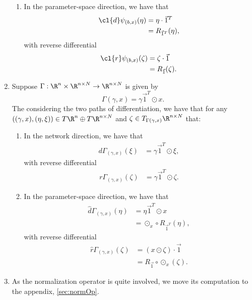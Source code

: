 \begin{enumerate}
\begin{enumerate}
		\item In the parameter-space direction, we have that
		\begin{align*}
			\cl{d}\psi_{(b,x)}(\eta)&=\eta\cdot\vec{1}^T\\
			&=R_{\vec{1}^T}(\eta),
		\end{align*}
		with reverse differential
		\begin{align*}
			\cl{r}\psi_{(b,x)}(\zeta)&=\zeta\cdot\vec{1}\\
			&=R_{\vec{1}}(\zeta).
		\end{align*}
	\end{enumerate}
	
	\item Suppose $\Gamma:\R^n\times\R^{n\times N}\to\R^{n\times N}$ is given by
	$$\Gamma(\gamma,x)=\gamma\vec{1}^T\odot x.$$
	The considering the two paths of differentiation, we have that for any $((\gamma,x), (\eta,\xi))\in T\R^n\oplus T\R^{n\times N}$ and $\zeta\in T_{\Gamma(\gamma,x)}\R^{n\times N}$ that:
	\begin{enumerate}
		\item In the network direction, we have that
		\begin{align*}
			d\Gamma_{(\gamma,x)}(\xi)&=\gamma\vec{1}^T\odot\xi,
		\end{align*}
		with reverse differential
		\begin{align*}
			r\Gamma_{(\gamma,x)}(\zeta)&=\gamma\vec{1}^T\odot\zeta.
		\end{align*}
		
		\item In the parameter-space direction, we have that
		\begin{align*}
			\hat{d}\Gamma_{(\gamma,x)}(\eta)&=\eta\vec{1}^T\odot x\\
			&=\odot_x\circ R_{\vec{1}^T}(\eta),
		\end{align*}
		with reverse differential
		\begin{align*}
			\hat{r}\Gamma_{(\gamma,x)}(\zeta)&=(x\odot\zeta)\cdot\vec{1}\\
			&=R_{\vec{1}}\circ\odot_x(\zeta).
		\end{align*}
	\end{enumerate}
	
	\item As the normalization operator is quite involved, we move its computation to the appendix, \cref{sec:normOp}.
	

\end{enumerate}
